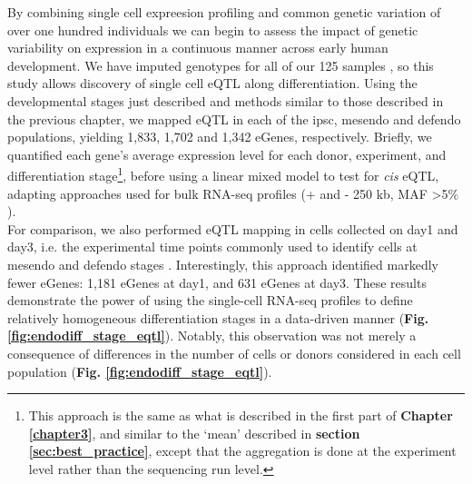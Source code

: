 By combining single cell expreesion profiling and common genetic variation of over one hundred individuals we can begin to assess the impact of genetic variability on expression in a continuous manner across early human development.
We have imputed genotypes for all of our 125 samples \cite{kilpinen2017common}, so this study allows discovery of single cell eQTL along differentiation. 
Using the developmental stages just described and methods similar to those described in the previous chapter, we mapped eQTL in each of the \gls{ipsc}, mesendo and defendo populations, yielding 1,833, 1,702 and 1,342 eGenes, respectively. 
Briefly, we quantified each gene’s average expression level for each donor, experiment, and differentiation stage\footnote{This approach is the same as what is described in the first part of \textbf{Chapter \ref{chapter3}}, and similar to the `mean' described in \textbf{section \ref{sec:best_practice}}, except that the aggregation is done at the experiment level rather than the sequencing run level.}, before using a linear mixed model to test for \textit{cis} eQTL, adapting approaches used for bulk RNA-seq profiles (+ and - 250 kb, MAF >5\% \cite{kilpinen2017common}).\\

For comparison, we also performed eQTL mapping in cells collected on day1 and day3, i.e. the experimental time points commonly used to identify cells at mesendo and defendo stages \cite{hannan2013production}.
Interestingly, this approach identified markedly fewer eGenes: 1,181 eGenes at day1, and 631 eGenes at day3.
These results demonstrate the power of using the single-cell RNA-seq profiles to define relatively homogeneous differentiation stages in a data-driven manner (\textbf{Fig. \ref{fig:endodiff_stage_eqtl}}). 
Notably, this observation was not merely a consequence of differences in the number of cells or donors considered in each cell population (\textbf{Fig. \ref{fig:endodiff_stage_eqtl}}). \\

